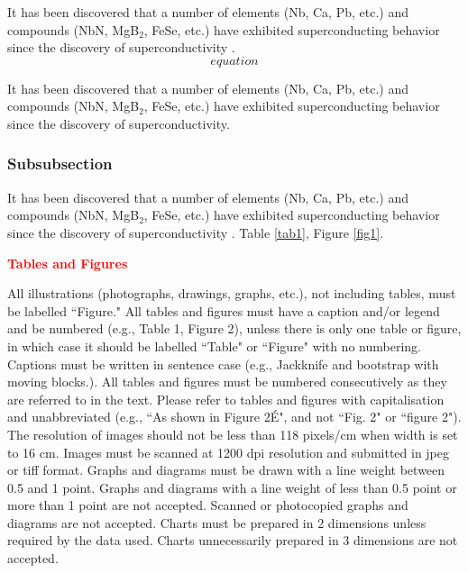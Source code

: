 \documentclass{fizik}
\begin{document}
It has been discovered that a number of elements (Nb, Ca, Pb, etc.) and 
compounds (NbN, MgB$_{2}$, FeSe, etc.) have exhibited superconducting 
behavior since the discovery of superconductivity \cite{2}. 
\begin{equation}
\label{eq2}
equation
\end{equation}

It has been discovered that a number of elements (Nb, Ca, Pb, etc.) and 
compounds (NbN, MgB$_{2}$, FeSe, etc.) have exhibited superconducting 
behavior since the discovery of superconductivity.

\subsubsection{Subsubsection}
It has been discovered that a number of elements (Nb, Ca, Pb, etc.) and 
compounds (NbN, MgB$_{2}$, FeSe, etc.) have exhibited superconducting 
behavior since the discovery of superconductivity \cite{1}. Table \ref{tab1}, Figure \ref{fig1}.

\textcolor{red}{\textbf{Tables and Figures}}

All illustrations (photographs, drawings, graphs, etc.), not including tables, must be labelled ``Figure."
All tables and figures must have a caption and/or legend and be numbered (e.g., Table 1, Figure 2), unless there is
only one table or figure, in which case it should be labelled ``Table" or ``Figure" with no numbering. Captions must be
written in sentence case (e.g., Jackknife and bootstrap with moving blocks.).
All tables and figures must be numbered consecutively as they are referred to in the text. Please refer to tables and
figures with capitalisation and unabbreviated (e.g., ``As shown in Figure 2É", and not ``Fig. 2" or ``figure 2").
The resolution of images should not be less than 118 pixels/cm when width is set to 16 cm. Images must be scanned
at 1200 dpi resolution and submitted in jpeg or tiff format.
Graphs and diagrams must be drawn with a line weight between 0.5 and 1 point. Graphs and diagrams with a line
weight of less than 0.5 point or more than 1 point are not accepted. Scanned or photocopied graphs and diagrams are not
accepted.
Charts must be prepared in 2 dimensions unless required by the data used. Charts unnecessarily prepared in 3
dimensions are not accepted.
\end{document}

